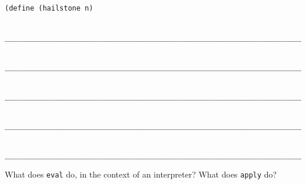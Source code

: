 \documentclass[twoside]{article}
\begin{document}
\begin{enumerate}
\begin{lstlisting}
(define (hailstone n)

  ________________________________________________________________________
  
  ________________________________________________________________________
  
  ________________________________________________________________________
    
  ________________________________________________________________________
  
  ________________________________________________________________________)
\end{lstlisting}


What does {\tt eval} do, in the context of an interpreter? What does {\tt apply} do?

\end{enumerate}
\end{document}
